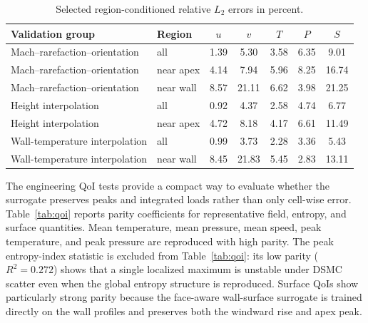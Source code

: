 \documentclass[aip,pof,preprint,notitlepage,floatfix,amsmath,amssymb]{revtex4-2}
\begin{document}
\begin{table}[t]
\centering
\caption{Selected region-conditioned relative $L_2$ errors in percent.}
\label{tab:region}
\begin{tabular}{llccccc}
\toprule
Validation group & Region & $u$ & $v$ & $T$ & $P$ & $S$ \\
\midrule
Mach--rarefaction--orientation & all & 1.39 & 5.30 & 3.58 & 6.35 & 9.01 \\
Mach--rarefaction--orientation & near apex & 4.14 & 7.94 & 5.96 & 8.25 & 16.74 \\
Mach--rarefaction--orientation & near wall & 8.57 & 21.11 & 6.62 & 3.98 & 21.25 \\
Height interpolation & all & 0.92 & 4.37 & 2.58 & 4.74 & 6.77 \\
Height interpolation & near apex & 4.72 & 8.18 & 4.17 & 6.61 & 11.49 \\
Wall-temperature interpolation & all & 0.99 & 3.73 & 2.28 & 3.36 & 5.43 \\
Wall-temperature interpolation & near wall & 8.45 & 21.83 & 5.45 & 2.83 & 13.11 \\
\bottomrule
\end{tabular}
\end{table}

The engineering QoI tests provide a compact way to evaluate whether the surrogate preserves peaks and integrated loads rather than only cell-wise error. Table~\ref{tab:qoi} reports parity coefficients for representative field, entropy, and surface quantities. Mean temperature, mean pressure, mean speed, peak temperature, and peak pressure are reproduced with high parity. The peak entropy-index statistic is excluded from Table~\ref{tab:qoi}: its low parity ($R^2=0.272$) shows that a single localized maximum is unstable under DSMC scatter even when the global entropy structure is reproduced. Surface QoIs show particularly strong parity because the face-aware wall-surface surrogate is trained directly on the wall profiles and preserves both the windward rise and apex peak.
\end{document}
